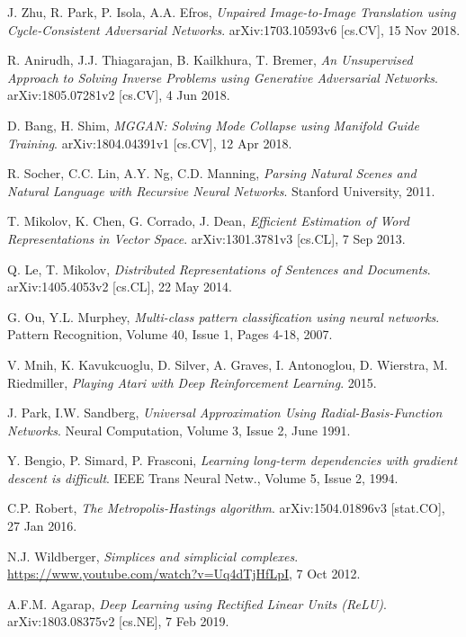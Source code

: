 \documentclass[../main.tex]{subfiles}
\begin{document}
\begin{thebibliography}{999}
  J. Zhu, R. Park, P. Isola, A.A. Efros,
  \emph{Unpaired Image-to-Image Translation using Cycle-Consistent Adversarial Networks}.
  arXiv:1703.10593v6 [cs.CV],
  15 Nov 2018.

  R. Anirudh, J.J. Thiagarajan, B. Kailkhura, T. Bremer,
  \emph{An Unsupervised Approach to Solving Inverse Problems using Generative Adversarial Networks}.
  arXiv:1805.07281v2 [cs.CV],
  4 Jun 2018.

  D. Bang, H. Shim,
  \emph{MGGAN: Solving Mode Collapse using Manifold Guide Training}.
  arXiv:1804.04391v1 [cs.CV],
  12 Apr 2018.

  R. Socher, C.C. Lin, A.Y. Ng, C.D. Manning,
  \emph{Parsing Natural Scenes and Natural Language with Recursive Neural Networks}.
  Stanford University,
  2011.

  T. Mikolov, K. Chen, G. Corrado, J. Dean,
  \emph{Efficient Estimation of Word Representations in Vector Space}.
  arXiv:1301.3781v3 [cs.CL],
  7 Sep 2013.

  Q. Le, T. Mikolov,
  \emph{Distributed Representations of Sentences and Documents}.
  arXiv:1405.4053v2 [cs.CL],
  22 May 2014.

  G. Ou, Y.L. Murphey,
  \emph{Multi-class pattern classification using neural networks}.
  Pattern Recognition,
  Volume 40, Issue 1, Pages 4-18,
  2007.

  V. Mnih, K. Kavukcuoglu, D. Silver, A. Graves, I. Antonoglou, D. Wierstra, M. Riedmiller,
  \emph{Playing Atari with Deep Reinforcement Learning}.
  2015.

  J. Park, I.W. Sandberg,
  \emph{Universal Approximation Using Radial-Basis-Function Networks}.
  Neural Computation,
  Volume 3, Issue 2,
  June 1991.

  Y. Bengio, P. Simard, P. Frasconi,
  \emph{Learning long-term dependencies with gradient descent is difficult}.
  IEEE Trans Neural Netw.,
  Volume 5, Issue 2,
  1994.

  C.P. Robert,
  \emph{The Metropolis-Hastings algorithm}.
  arXiv:1504.01896v3 [stat.CO],
  27 Jan 2016.

  N.J. Wildberger,
  \emph{Simplices and simplicial complexes}.
  \url{https://www.youtube.com/watch?v=Uq4dTjHfLpI},
  7 Oct 2012.

  A.F.M. Agarap,
  \emph{Deep Learning using Rectified Linear Units (ReLU)}.
  arXiv:1803.08375v2 [cs.NE],
  7 Feb 2019.


\end{thebibliography}
\end{document}
